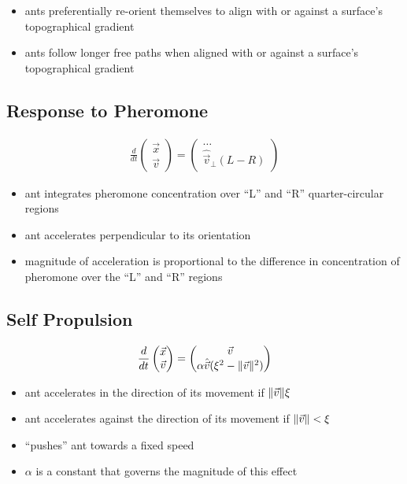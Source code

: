 

\begin{itemize}
	\item ants preferentially re-orient themselves to align with or against a surface's topographical gradient {\cite{khuong_how_2013}}
    \item ants follow longer free paths when aligned with or against a surface's topographical gradient {\scriptsize\cite{khuong_how_2013}}
\end{itemize}


\subsection{Response to Pheromone}
\begin{align*}
\frac{d}{dt} \begin{pmatrix}\vec{x}\\\vec{v}\end{pmatrix} = \begin{pmatrix}\hdots\\ \hat{\vec{v}}_{\perp}(L - R)\end{pmatrix}
\end{align*}
\begin{itemize}
	\item ant integrates pheromone concentration over ``L'' and ``R'' quarter-circular regions
    \item ant accelerates perpendicular to its orientation
    \item magnitude of acceleration is proportional to the difference in concentration of pheromone over the ``L'' and ``R'' regions
\end{itemize}


\subsection{Self Propulsion}

\begin{align*}
			\frac{d}{dt} \begin{pmatrix}\vec{x}\\\vec{v}\end{pmatrix} = \begin{pmatrix}\vec{v}\\ \alpha \hat{\vec{v}}(\xi^2 - \lVert\vec{v}\rVert^2)\end{pmatrix}
\end{align*}

\begin{itemize}
	\item ant accelerates in the direction of its movement if $\lVert\vec{v}\rVert  \xi$
    \item ant accelerates against the direction of its movement if $\lVert\vec{v}\rVert < \xi$
    \item``pushes'' ant towards a fixed speed
    \item $\alpha$ is a constant that governs the magnitude of this effect
\end{itemize}

